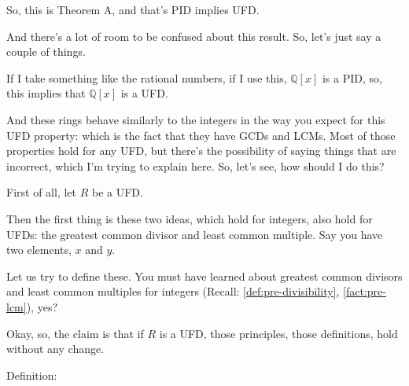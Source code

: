 \begin{speech}[01:15:54 - 01:18:14]
So, this is Theorem A, and that's PID implies UFD. 

And there's a lot of room to be confused about this result. So, let's just say a couple of things.

If I take something like the rational numbers, if I use this, $\mathbb{Q}[x]$ is a PID, so, this implies that $\mathbb{Q}[x]$ is a UFD. 

And these rings behave similarly to the integers in the way you expect for this UFD property: which is the fact that they have GCDs and LCMs. Most of those properties hold for any UFD, but there's the possibility of saying things that are incorrect, which I'm trying to explain here. So, let's see, how should I do this?

First of all, let $R$ be a UFD. 

Then the first thing is these two ideas, which hold for integers, also hold for UFDs: the greatest common divisor  and least common multiple.  Say you have two elements, $x$ and $y$. 

Let us try to define these. You must have learned about greatest common divisors and least common multiples for integers (Recall: \cref{def:pre-divisibility}, \cref{fact:pre-lcm}), yes?

Okay, so, the claim is that if $R$ is a UFD, those principles, those definitions, hold without any change.

Definition: 
\end{speech}

\begin{content}
\end{content}

